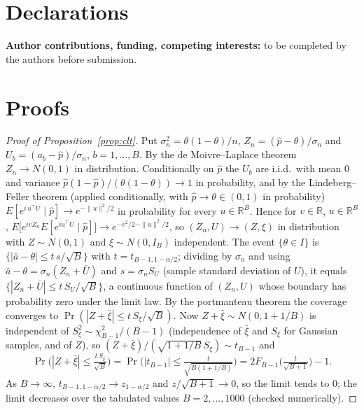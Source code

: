 \documentclass[11pt,a4paper]{article}
\theoremstyle{remark}\newtheorem{remark}{Remark}
\newcommand{\R}{\mathbb{R}}
\begin{document}
\section*{Declarations}
\noindent\textbf{Author contributions, funding, competing interests:} to be completed by the authors before submission.

\appendix
\section{Proofs}\label{app:proofs}
\begin{proof}[Proof of Proposition~\ref{prop:clt}]
Put $\sigma_n^2=\theta(1-\theta)/n$, $Z_n=(\hat p-\theta)/\sigma_n$ and $U_b=(a_b-\hat p)/\sigma_n$, $b=1,\dots,B$. By the de Moivre--Laplace theorem $Z_n\to N(0,1)$ in distribution. Conditionally on $\hat p$ the $U_b$ are i.i.d.\ with mean $0$ and variance $\hat p(1-\hat p)/(\theta(1-\theta))\to1$ in probability, and by the Lindeberg--Feller theorem (applied conditionally, with $\hat p\to\theta\in(0,1)$ in probability) $E[e^{i\,u^\top U}\mid\hat p]\to e^{-\|u\|^2/2}$ in probability for every $u\in\R^B$. Hence for $v\in\R$, $u\in\R^B$, $E\big[e^{ivZ_n}E[e^{iu^\top U}\mid \hat p]\big]\to e^{-v^2/2-\|u\|^2/2}$, so $(Z_n,U)\to(Z,\xi)$ in distribution with $Z\sim N(0,1)$ and $\xi\sim N(0,I_B)$ independent. The event $\{\theta\in I\}$ is $\{|\bar a-\theta|\le t\,s/\sqrt B\}$ with $t=t_{B-1,1-\alpha/2}$; dividing by $\sigma_n$ and using $\bar a-\theta=\sigma_n(Z_n+\bar U)$ and $s=\sigma_nS_U$ (sample standard deviation of $U$), it equals $\{|Z_n+\bar U|\le t\,S_U/\sqrt B\}$, a continuous function of $(Z_n,U)$ whose boundary has probability zero under the limit law. By the portmanteau theorem the coverage converges to $\Pr(|Z+\bar\xi|\le t\,S_\xi/\sqrt B)$. Now $Z+\bar\xi\sim N(0,1+1/B)$ is independent of $S_\xi^2\sim\chi^2_{B-1}/(B-1)$ (independence of $\bar\xi$ and $S_\xi$ for Gaussian samples, and of $Z$), so $(Z+\bar\xi)/(\sqrt{1+1/B}\,S_\xi)\sim t_{B-1}$ and
\[
\Pr\!\Big(|Z+\bar\xi|\le \tfrac{t\,S_\xi}{\sqrt B}\Big)=\Pr\!\Big(|t_{B-1}|\le\tfrac{t}{\sqrt{B(1+1/B)}}\Big)=2F_{B-1}\!\Big(\tfrac{t}{\sqrt{B+1}}\Big)-1.
\]
As $B\to\infty$, $t_{B-1,1-\alpha/2}\to z_{1-\alpha/2}$ and $z/\sqrt{B+1}\to0$, so the limit tends to $0$; the limit decreases over the tabulated values $B=2,\dots,1000$ (checked numerically).
\end{proof}
\end{document}
